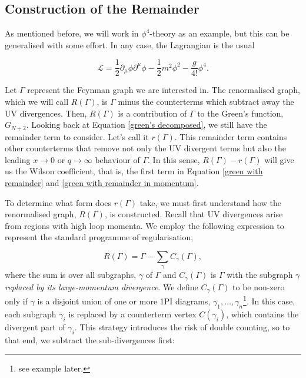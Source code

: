 \documentclass{scrartcl}
\begin{document}
\subsection{Construction of the Remainder}

As mentioned before, we will work in $\phi^4$-theory as an example, but this can be generalised with  some effort. In any case, the Lagrangian is the usual

\begin{equation}
    \mathcal{L}= \frac{1}{2}\partial_\mu\phi\partial^\mu\phi - \frac{1}{2}m^2\phi^2 - \frac{g}{4!}\phi^4.
\end{equation}

Let $\Gamma$ represent the Feynman graph we are interested in. The renormalised graph, which we will call $R(\Gamma)$, is $\Gamma$ minus the counterterms which subtract away the UV divergences. Then, $R(\Gamma)$ is a contribution of $\Gamma$ to the Green's function, $G_{N+2}$. Looking back at Equation \ref{green's decomposed}, we still have the remainder term to consider. Let's call it $r(\Gamma)$. This remainder term contains other counterterms that remove not only the UV divergent terms but also the leading $x\rightarrow 0$ or $q \rightarrow \infty$ behaviour of $\Gamma$. In this sense, $R(\Gamma) - r(\Gamma)$ will give us the Wilson coefficient, that is, the first term in Equation \ref{green with remainder} and \ref{green with remainder in momentum}.

To determine what form does $r(\Gamma)$ take, we must first understand how the renormalised graph, $R(\Gamma)$, is constructed. Recall that UV divergences arise from regions with high loop momenta. We employ the following expression to represent the standard programme of regularisation,

\begin{equation}
    R(\Gamma) = \Gamma - \sum_\gamma C_\gamma(\Gamma),
\end{equation}
where the sum is over all subgraphs, $\gamma$ of $\Gamma$ and $C_\gamma(\Gamma)$ is $\Gamma$ with the subgraph $\gamma$ \textit{replaced by its large-momentum divergence}. We define $C_\gamma(\Gamma)$ to be non-zero only if $\gamma$ is a disjoint union of one or more 1PI diagrams, $\gamma_1,\dots,\gamma_n$\footnote{see example later.}. In this case, each subgraph $\gamma_i$ is replaced by a counterterm vertex $C(\gamma_i)$, which contains the divergent part of $\gamma_i$. This strategy introduces the risk of double counting, so to that end, we subtract the sub-divergences first:
\end{document}
